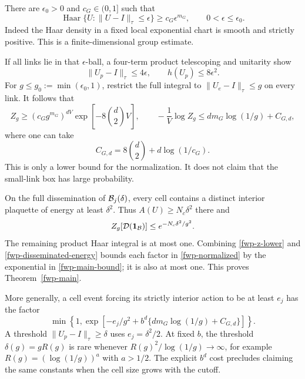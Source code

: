 \documentclass[11pt]{article}
\theoremstyle{remark}
\begin{document}
There are \(\epsilon_0>0\) and \(c_G\in(0,1]\) such that
\begin{equation}
 \operatorname{Haar}\{U:\|U-I\|_\tau\le\epsilon\}
       \ge c_G\epsilon^{m_G},\qquad 0<\epsilon\le\epsilon_0.
 \label{fwp-haar-ball}
\end{equation}
Indeed the Haar density in a fixed local exponential chart is smooth
and strictly positive. This is a finite-dimensional group estimate.

If all links lie in that \(\epsilon\)-ball, a four-term product
telescoping and unitarity show
\[
 \|U_p-I\|_\tau\le4\epsilon,\qquad h(U_p)\le8\epsilon^2.
\]
For \(g\le g_0:=\min(\epsilon_0,1)\), restrict the full integral to
\(\|U_e-I\|_\tau\le g\) on every link. It follows that
\begin{equation}
 Z_g\ge(c_Gg^{m_G})^{dV}
             \exp\!\left[-8\binom d2V\right],
 \qquad
 -\frac1V\log Z_g
       \le d m_G\log(1/g)+C_{G,d},
 \label{fwp-z-lower}
\end{equation}
where one can take
\[
 C_{G,d}=8\binom d2+d\log(1/c_G).
\]
This is only a lower bound for the normalization. It does not claim
that the small-link box has large probability.

On the full dissemination of \({\cal B}_j(\delta)\), every cell
contains a distinct interior plaquette of energy at least \(\delta^2\).
Thus \(A(U)\ge N_c\delta^2\) there and
\begin{equation}
 Z_g[{\cal D}(\mathbf1_{\cal B})]
       \le e^{-N_c\delta^2/g^2}.
 \label{fwp-disseminated-energy}
\end{equation}
The remaining product Haar integral is at most one.
Combining \eqref{fwp-z-lower} and \eqref{fwp-disseminated-energy}
bounds each factor in \eqref{fwp-normalized} by the exponential in
\eqref{fwp-main-bound}; it is also at most one.
This proves Theorem~\ref{fwp-main}.

More generally, a cell event forcing its strictly interior action to be
at least \(e_j\) has the factor
\begin{equation}
 \min\left\{1,\exp\left[-e_j/g^2
              +b^d\{d m_G\log(1/g)+C_{G,d}\}\right]\right\}.
 \label{fwp-energy-general}
\end{equation}
A threshold \(\|U_p-I\|_\tau\ge\delta\) uses \(e_j=\delta^2/2\).
At fixed \(b\), the threshold \(\delta(g)=gR(g)\) is rare whenever
\(R(g)^2/\log(1/g)\to\infty\), for example
\(R(g)=(\log(1/g))^a\) with \(a>1/2\).
The explicit \(b^d\) cost precludes claiming the same constants when
the cell size grows with the cutoff.
\end{document}
